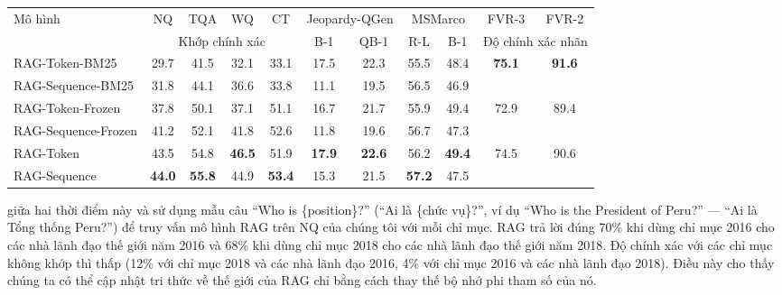 \documentclass[10pt,letterpaper]{article}
\begin{document}
\begin{table}[t]
\vspace{14pt}
\label{tab:ablation}
\vspace{2pt}
\small
\setlength{\tabcolsep}{3.6pt}
\begin{tabular}{@{}lcccc@{\hspace{9pt}}cc@{\hspace{9pt}}cc@{\hspace{9pt}}cc@{}}
  \toprule
  \multirow{2}{*}{Mô hình} & NQ & TQA & WQ & CT &
    \multicolumn{2}{c}{Jeopardy-QGen} & \multicolumn{2}{c}{MSMarco} &
    FVR-3 & FVR-2\\
   & \multicolumn{4}{c}{Khớp chính xác} & B-1 & QB-1 & R-L & B-1 &
    \multicolumn{2}{c}{Độ chính xác nhãn}\\
  \midrule
  RAG-Token-BM25 & 29.7 & 41.5 & 32.1 & 33.1 & 17.5 & 22.3 & 55.5 & 48.4 &
    \multirow{2}{*}{\textbf{75.1}} & \multirow{2}{*}{\textbf{91.6}}\\
  RAG-Sequence-BM25 & 31.8 & 44.1 & 36.6 & 33.8 & 11.1 & 19.5 & 56.5 & 46.9
    & & \\
  \midrule
  RAG-Token-Frozen & 37.8 & 50.1 & 37.1 & 51.1 & 16.7 & 21.7 & 55.9 & 49.4 &
    \multirow{2}{*}{72.9} & \multirow{2}{*}{89.4}\\
  RAG-Sequence-Frozen & 41.2 & 52.1 & 41.8 & 52.6 & 11.8 & 19.6 & 56.7 & 47.3
    & & \\
  \midrule
  RAG-Token & 43.5 & 54.8 & \textbf{46.5} & 51.9 & \textbf{17.9} &
    \textbf{22.6} & 56.2 & \textbf{49.4} &
    \multirow{2}{*}{74.5} & \multirow{2}{*}{90.6}\\
  RAG-Sequence & \textbf{44.0} & \textbf{55.8} & 44.9 & \textbf{53.4} & 15.3 &
    21.5 & \textbf{57.2} & 47.5 & & \\
  \bottomrule
\end{tabular}
\end{table}

giữa hai thời điểm này và sử dụng mẫu câu ``Who is \{position\}?'' (``Ai là
\{chức vụ\}?'', ví dụ ``Who is the President of Peru?'' --- ``Ai là Tổng thống
Peru?'') để truy vấn mô hình RAG trên NQ của chúng tôi với mỗi chỉ mục. RAG trả
lời đúng 70\% khi dùng chỉ mục 2016 cho các nhà lãnh đạo thế giới năm 2016 và
68\% khi dùng chỉ mục 2018 cho các nhà lãnh đạo thế giới năm 2018. Độ chính xác
với các chỉ mục không khớp thì thấp (12\% với chỉ mục 2018 và các nhà lãnh đạo
2016, 4\% với chỉ mục 2016 và các nhà lãnh đạo 2018). Điều này cho thấy chúng
ta có thể cập nhật tri thức về thế giới của RAG chỉ bằng cách thay thế bộ nhớ
phi tham số của nó.
\end{document}
